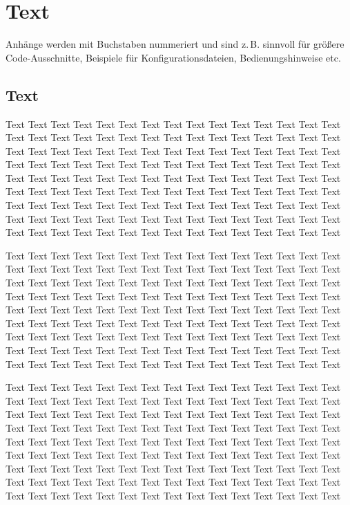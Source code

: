 \chapter{Text}

Anhänge werden mit Buchstaben nummeriert und sind z.\,B. sinnvoll für
größere Code-Ausschnitte,
Beispiele für Konfigurationsdateien, Bedienungshinweise etc.

\section{Text}

Text Text Text Text Text Text Text Text Text Text Text Text Text Text Text 
Text Text Text Text Text Text Text Text Text Text Text Text Text Text Text 
Text Text Text Text Text Text Text Text Text Text Text Text Text Text Text 
Text Text Text Text Text Text Text Text Text Text Text Text Text Text Text 
Text Text Text Text Text Text Text Text Text Text Text Text Text Text Text 
Text Text Text Text Text Text Text Text Text Text Text Text Text Text Text 
Text Text Text Text Text Text Text Text Text Text Text Text Text Text Text 
Text Text Text Text Text Text Text Text Text Text Text Text Text Text Text 
Text Text Text Text Text Text Text Text Text Text Text Text Text Text Text 

Text Text Text Text Text Text Text Text Text Text Text Text Text Text Text 
Text Text Text Text Text Text Text Text Text Text Text Text Text Text Text 
Text Text Text Text Text Text Text Text Text Text Text Text Text Text Text 
Text Text Text Text Text Text Text Text Text Text Text Text Text Text Text 
Text Text Text Text Text Text Text Text Text Text Text Text Text Text Text 
Text Text Text Text Text Text Text Text Text Text Text Text Text Text Text 
Text Text Text Text Text Text Text Text Text Text Text Text Text Text Text 
Text Text Text Text Text Text Text Text Text Text Text Text Text Text Text 
Text Text Text Text Text Text Text Text Text Text Text Text Text Text Text 

Text Text Text Text Text Text Text Text Text Text Text Text Text Text Text 
Text Text Text Text Text Text Text Text Text Text Text Text Text Text Text 
Text Text Text Text Text Text Text Text Text Text Text Text Text Text Text 
Text Text Text Text Text Text Text Text Text Text Text Text Text Text Text 
Text Text Text Text Text Text Text Text Text Text Text Text Text Text Text 
Text Text Text Text Text Text Text Text Text Text Text Text Text Text Text 
Text Text Text Text Text Text Text Text Text Text Text Text Text Text Text 
Text Text Text Text Text Text Text Text Text Text Text Text Text Text Text 
Text Text Text Text Text Text Text Text Text Text Text Text Text Text Text 

